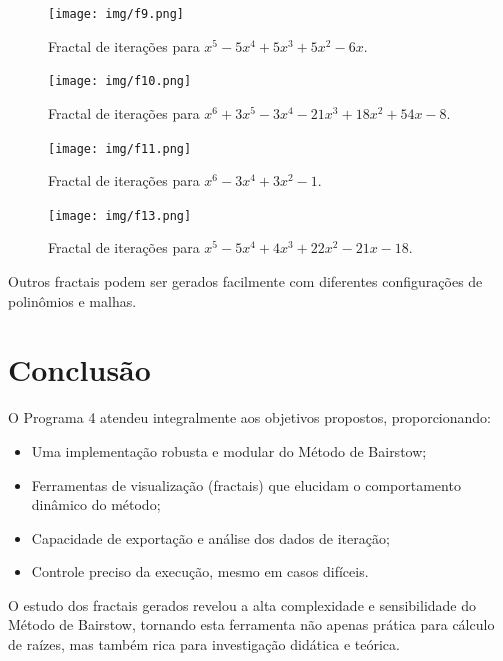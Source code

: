\documentclass[12pt]{article}
\begin{document}
\begin{figure}[H]
\centering
\texttt{[image: img/f9.png]}
\caption{Fractal de iterações para $x^5 - 5x^4 + 5x^3 + 5x^2 - 6x$.}
\end{figure}

\begin{figure}[H]
\centering
\texttt{[image: img/f10.png]}
\caption{Fractal de iterações para $x^6 + 3x^5 - 3x^4 - 21x^3 + 18x^2 + 54x - 8$.}
\end{figure}

\begin{figure}[H]
\centering
\texttt{[image: img/f11.png]}
\caption{Fractal de iterações para $x^6 - 3x^4 + 3x^2 - 1$.}
\end{figure}

\begin{figure}[H]
\centering
\texttt{[image: img/f13.png]}
\caption{Fractal de iterações para $x^5 - 5x^4 + 4x^3 + 22x^2 - 21x - 18$.}
\end{figure}

Outros fractais podem ser gerados facilmente com diferentes configurações de polinômios e malhas.

\section{Conclusão}

O Programa 4 atendeu integralmente aos objetivos propostos, proporcionando:

\begin{itemize}
\item Uma implementação robusta e modular do Método de Bairstow;
\item Ferramentas de visualização (fractais) que elucidam o comportamento dinâmico do método;
\item Capacidade de exportação e análise dos dados de iteração;
\item Controle preciso da execução, mesmo em casos difíceis.
\end{itemize}

O estudo dos fractais gerados revelou a alta complexidade e sensibilidade do Método de Bairstow, tornando esta ferramenta não apenas prática para cálculo de raízes, mas também rica para investigação didática e teórica.
\end{document}

